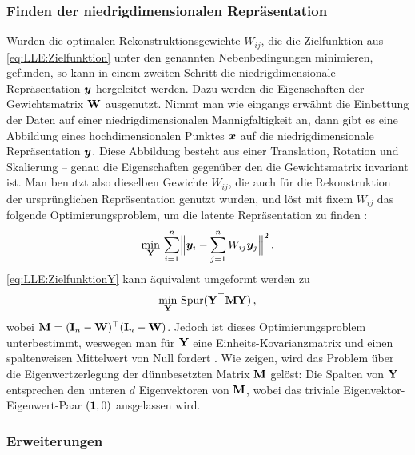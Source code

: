 \subsubsection{Finden der niedrigdimensionalen Repräsentation}
\label{ch:MethodenDerDimRed:statistisch:LLE:FindenDerRepr}
Wurden die optimalen Rekonstruktionsgewichte $W_{ij}$, die die Zielfunktion aus
\eqref{eq:LLE:Zielfunktion} unter den genannten Nebenbedingungen minimieren, gefunden, so kann in einem zweiten Schritt die niedrigdimensionale Repräsentation $\bm{y}$ hergeleitet werden. Dazu werden die Eigenschaften der Gewichtsmatrix $\mathbf{W}$ ausgenutzt. Nimmt man wie eingangs erwähnt die Einbettung der Daten auf einer niedrigdimensionalen Mannigfaltigkeit an, dann gibt es eine Abbildung eines hochdimensionalen Punktes $\bm{x}$ auf die niedrigdimensionale Repräsentation $\bm{y}$. Diese Abbildung besteht aus einer Translation, Rotation und Skalierung -- genau die Eigenschaften gegenüber den die Gewichtsmatrix invariant ist. Man benutzt also dieselben Gewichte $W_{ij}$, die auch für die Rekonstruktion der ursprünglichen Repräsentation genutzt wurden, und löst mit fixem $W_{ij}$ das folgende Optimierungsproblem, um die latente Repräsentation zu finden \parencite[2324]{Roweis.2000}:
\begin{equation}
	\label{eq:LLE:ZielfunktionY}
	\min_{\mat{Y}}\, \sum_{i = 1}^n \norm[\Big]{\vect{y}_i - \sum_{j = 1}^n W_{ij}\vect{y}_j}^2 \, .
\end{equation}
\eqref{eq:LLE:ZielfunktionY} kann äquivalent umgeformt werden zu \parencite[4]{Ghojogh.2020}
\begin{equation}
	\min_{\mathbf{Y}}\, \operatorname{Spur}(\mathbf{Y}^\top \mathbf{M} \mathbf{Y}) \, ,
\end{equation}
wobei $\mathbf{M} = (\mathbf{I}_n - \mathbf{W})^\top (\mathbf{I}_n - \mathbf{W})$. Jedoch ist dieses Optimierungsproblem unterbestimmt, weswegen man für $\mathbf{Y}$ eine Einheits-Kovarianzmatrix und einen spaltenweisen Mittelwert von Null fordert \parencite[11]{Saul.2000}. Wie \textcite[3 -- 4]{Ghojogh.2020} zeigen, wird das Problem über die
Eigenwertzerlegung der dünnbesetzten Matrix $\mathbf{M}$ gelöst: Die Spalten von $\mathbf{Y}$ entsprechen
den unteren $d$ Eigenvektoren von $\mathbf{M}$, wobei das triviale Eigenvektor-Eigenwert-Paar $(\bm{1},
	0)$ ausgelassen wird.

\subsubsection{Erweiterungen}
\label{ch:MethodenDerDimRed:statistisch:LLE:Erweiterungen}

